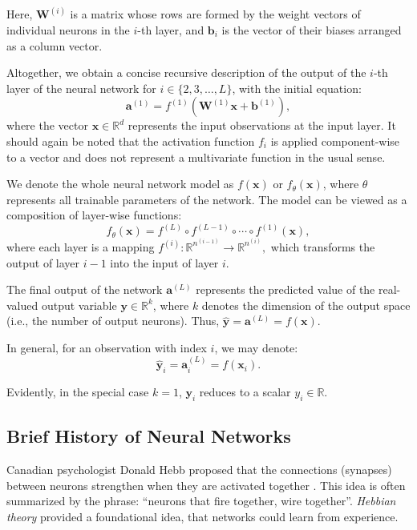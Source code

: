 Here, $\mathbf{W}^{(i)}$ is a matrix whose rows are formed by the weight vectors of individual neurons in the $i$-th layer, and $\mathbf{b}_i$ is the vector of their biases arranged as a column vector.

Altogether, we obtain a concise recursive description of the output of the $i$-th layer of the neural network for $i \in \{2,3,\dots,L\}$, with the initial equation:
\begin{equation*}
\mathbf{a}^{(1)} = f^{(1)}\!\left(\mathbf{W}^{(1)} \mathbf{x} + \mathbf{b}^{(1)} \right),
\end{equation*}
where the vector $\mathbf{x} \in \mathbb{R}^d$ represents the input observations at the input layer. It should again be noted that the activation function $f_i$ is applied component-wise to a vector and does not represent a multivariate function in the usual sense.

We denote the whole neural network model as $f(\mathbf{x})$ or $f_\theta(\mathbf{x})$, where $\theta$ represents all trainable parameters of the network. The model can be viewed as a composition of layer-wise functions:
\begin{equation*}
f_\theta(\mathbf{x}) = f^{(L)} \circ f^{(L-1)} \circ \cdots \circ f^{(1)}(\mathbf{x}),
\end{equation*}
where each layer is a mapping
$
f^{(i)} : \mathbb{R}^{n^{(i-1)}} \to \mathbb{R}^{n^{(i)}},
$
which transforms the output of layer $i-1$ into the input of layer $i$.

The final output of the network $\mathbf{a}^{(L)}$ represents the predicted value of the real-valued output variable $\mathbf{y} \in \mathbb{R}^k$, where $k$ denotes the dimension of the output space (i.e., the number of output neurons). Thus, $\hat{\mathbf{y}} = \mathbf{a}^{(L)} = f(\mathbf{x})$.


In general, for an observation with index $i$, we may denote:
\begin{equation*}
\hat{\mathbf{y}}_i = \mathbf{a}^{(L)}_i = f(\mathbf{x}_i).
\end{equation*}

Evidently, in the special case $k = 1$, $\mathbf{y}_i$ reduces to a scalar $y_i \in \mathbb{R}$.

\subsection{Brief History of Neural Networks}
\label{sec:brief-notation}
Canadian psychologist Donald Hebb proposed that the connections (synapses) between neurons strengthen when they are activated together \cite{hebb1949}. This idea is often summarized by the phrase: “neurons that fire together, wire together”. \textit{Hebbian theory} provided a foundational idea, that networks could learn from experience.

